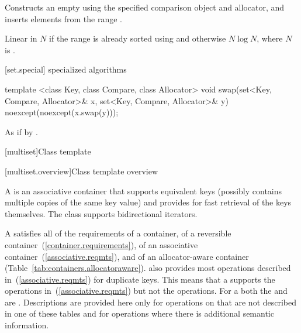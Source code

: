 \begin{itemdescr}
\pnum
\effects
Constructs an empty
using the specified comparison object and allocator,
and inserts elements from the range
.

\pnum
\complexity
Linear in $N$ if the range
is already sorted using 
and otherwise $N \log{N}$,
where $N$ is
.
\end{itemdescr}

[set.special]{ specialized algorithms}

%
%
\begin{itemdecl}
template <class Key, class Compare, class Allocator>
  void swap(set<Key, Compare, Allocator>& x,
            set<Key, Compare, Allocator>& y)
    noexcept(noexcept(x.swap(y)));
\end{itemdecl}

\begin{itemdescr}
\pnum
\effects
As if by .
\end{itemdescr}

[multiset]{Class template }

[multiset.overview]{Class template  overview}

\pnum
{}%
A
is an associative container that supports equivalent keys (possibly contains multiple copies of
the same key value) and provides for fast retrieval of the keys themselves.
The
 class
supports bidirectional iterators.

\pnum
A  satisfies all of the requirements of a container, of a
reversible container~(\ref{container.requirements}), of an associative
container~(\ref{associative.reqmts}), and of an allocator-aware container
(Table~\ref{tab:containers.allocatoraware}).
also provides most operations described in~(\ref{associative.reqmts})
for duplicate keys.
This means that a
supports the
operations in~(\ref{associative.reqmts})
but not the
operations.
For a
both the
and
are
.
Descriptions are provided here only for operations on
that are not described in one of these tables
and for operations where there is additional semantic information.

